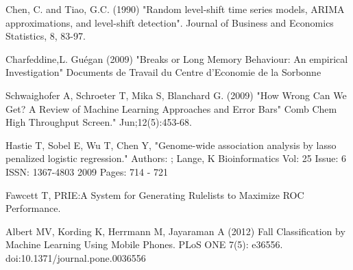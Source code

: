 \documentclass[12pt]{article}
\begin{document}
\begin{thebibliography}{1}
Chen, C. and Tiao, G.C. (1990) "Random level-shift time series models,
ARIMA approximations, and level-shift detection". Journal of Business
and Economics Statistics, 8, 83-97.

Charfeddine,L. Guégan (2009) "Breaks or Long Memory Behaviour: An empirical Investigation" Documents de Travail du Centre d’Economie de la Sorbonne

Schwaighofer A, Schroeter T, Mika S, Blanchard G. (2009) "How Wrong Can We Get? A Review of Machine Learning Approaches and Error Bars" Comb Chem High Throughput Screen."  Jun;12(5):453-68.

Hastie T, Sobel E, Wu T, Chen Y, "Genome-wide association analysis by lasso penalized logistic regression." Authors: ; Lange, K Bioinformatics Vol: 25 Issue: 6 ISSN: 1367-4803 2009 Pages: 714 - 721

Fawcett T, PRIE:A System for Generating Rulelists to Maximize ROC Performance.

Albert MV, Kording K, Herrmann M, Jayaraman A (2012) Fall Classification by Machine Learning Using Mobile Phones. PLoS ONE 7(5): e36556. doi:10.1371/journal.pone.0036556

\end{thebibliography}
\end{document}
